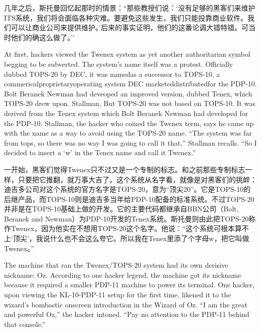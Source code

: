 \ifdefined\chs
几年之后，斯托曼回忆起那时的情景：``那些教授们说：`没有足够的黑客们来维护ITS系统，我们将会面临各种灾难。要避免这些发生，我们只能投靠商业软件。我们可以让商业公司来提供维护。'后来的事实证明，他们的这番论调大错特错。可当时他们的确这么做了。''
\fi

\ifdefined\eng
At first, hackers viewed the Twenex system as yet another authoritarian symbol begging to be subverted. The system's name itself was a protest. Officially dubbed TOPS-20 by DEC, it was \ifdefined\vtwo named\fi as a successor to TOPS-10, a \ifdefined\vone commerical\fi\ifdefined\vtwo proprietary\fi operating system DEC \ifdefined\vone marketed\fi\ifdefined\vtwo distributed\fi for the PDP-10. \ifdefined\vone Bolt Beranek Newman had deveoped an improved version, dubbed Tenex, which TOPS-20 drew upon. Stallman, \fi\ifdefined\vtwo But TOPS-20 was not based on TOPS-10.  It was derived from the Tenex system which Bolt Beranek Newman had developed for the PDP-10. Stallman, \fi the hacker who coined the Twenex term, says he came up with the name as a way to avoid using the TOPS-20 name. ``The system was far from tops, so there was no way I was going to call it that,'' Stallman recalls. ``So I decided to insert a `w' in the Tenex name and call it Twenex.''
\fi

\ifdefined\chs
一开始，黑客们觉得Twenex只不过又是一个专制的标志。和之前那些专制标志一样，只要把它推翻，就万事大吉了。这个系统从名字看，就像是对黑客们的挑衅：迪吉多公司对这个系统的官方名字是TOPS-20，意为``顶尖20''。它是TOPS-10的后继产品，而TOPS-10则是迪吉多当年给PDP-10配备的标准系统。不过TOPS-20并非是在TOPS-10基础上做的开发。它的主要代码都继承自BBN公司（Bolt, Beranek and Newman）为PDP-10开发的Tenex系统。斯托曼则由此把TOPS-20称作Twenex，因为他实在不想用TOPS-20这个名字。他说：``这个系统可根本算不上`顶尖'，我说什么也不会这么夸它。所以我在Tenex里添了个字母w，把它叫做Twenex。''
\fi

\ifdefined\eng
The machine that ran the Twenex/TOPS-20 system had its own derisive nickname: Oz. According to one hacker legend, the machine got its nickname because it required a smaller PDP-11 machine to power its terminal. One hacker, upon viewing the KL-10-PDP-11 setup for the first time, likened it to the wizard's bombastic onscreen introduction in the Wizard of Oz. ``I am the great and powerful Oz,'' the hacker intoned. ``Pay no attention to the PDP-11 behind that console.''
\fi

